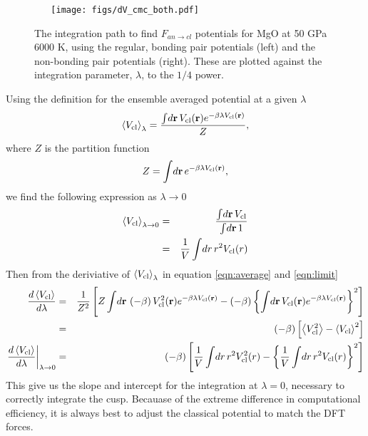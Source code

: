 \begin{figure}[h!]  
  \centering
  \texttt{[image: figs/dV\_cmc\_both.pdf]}
\caption{The integration path to find $F_{an \to cl}$ potentials for MgO at 50 GPa 6000
K, using the regular, bonding pair potentials (left) and
the non-bonding pair potentials (right). These are plotted against the
integration parameter, $\lambda$, to the $1/4$ power.}
\label{fig:integrate_cmc}
\end{figure}

Using the definition for the ensemble averaged potential at a given
$\lambda$
\begin{eqnarray}
  \left< V_{\rm cl} \right>_{\lambda} = \frac{ \int \! d{\bf r} \, V_{\rm cl}({\bf r}) 
  e^{ -\beta \lambda V_{\rm cl}({\bf r}) } }
  { Z}, \label{eqn:average}
\end{eqnarray}
where $Z$ is the partition function
\begin{eqnarray}
Z =  \int \! d{\bf r} \, e^{ -\beta \lambda V_{\rm cl}({\bf r}) },
\end{eqnarray}
we find the following expression as $\lambda \to 0$
\begin{eqnarray}
 \left< V_{\rm cl} \right>_{\lambda \to 0} &=& \frac{ \int \! d{\bf r} \, V_{\rm
 cl}}
 {  \int \! d{\bf r} \, 1} \nonumber \\
 &=& \frac{1}{V}  \int \! dr \, r^2 V_{\rm cl}(r) \label{eqn:limit}
\end{eqnarray}
Then from the deriviative of $\left< V_{\rm cl} \right>_{\lambda}$ in
equation \ref{eqn:average} and \ref{eqn:limit}
\begin{eqnarray}
  \frac{d \left< V_{\rm cl} \right>}{d \lambda}
   &=& \frac{1}{Z^2} 
  \left[ Z \int \! d{\bf r} \, \left(-\beta \right)V_{\rm cl}^2({\bf r}) 
    e^{ -\beta \lambda V_{\rm cl}({\bf r}) } 
   - \left(-\beta \right)\left\{  \int \! d{\bf r} \, V_{\rm cl}({\bf r}) e^{ -\beta \lambda
     V_{\rm cl}({\bf r}) } \right\}^2
    \right] \nonumber \\
   &=& (-\beta) \left[ \left< V_{\rm cl}^2 \right> - \left< V_{\rm
   cl}\right>^2 \right] \nonumber \\
   \left. \frac{d \left< V_{\rm cl} \right>}{d \lambda}\right|_{\lambda \to 0} 
   &=& (-\beta) \left[  \frac{1}{V}  \int \! dr \, r^2 V^2_{\rm cl}(r) -
     \left\{ \frac{1}{V}  \int \! dr \, r^2 V_{\rm cl}(r) \right\}^2 \right]
  \end{eqnarray}
This give us the slope and intercept for the integration at $\lambda=0$,
necessary to correctly integrate the cusp.  Becauase of the extreme
difference in computational efficiency, it is always best to adjust the
classical potential to match the DFT forces.


